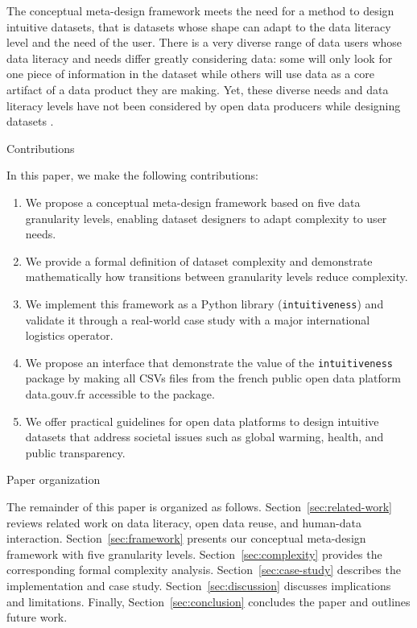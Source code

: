 \documentclass[]{hdsr}
\makeatletter
\def\subsection{\@startsection{subsection}{2}%
  \z@{.5\linespacing\@plus.7\linespacing}{.5\linespacing}%
  {\normalfont\bfseries}}
\theoremstyle{plain}      %
\theoremstyle{definition} %
\theoremstyle{remark}     %
\makeatother
\begin{document}
The conceptual meta-design framework meets the need for a method to design intuitive datasets, that is datasets whose shape can adapt to the data literacy level and the need of the user. There is a very diverse range of data users whose data literacy and needs differ greatly considering data: some will only look for one piece of information in the dataset while others will use data as a core artifact of a data product they are making. Yet, these diverse needs and data literacy levels have not been considered by open data producers while designing datasets \citep{dymytrova2018}.

\subsection{Contributions}

In this paper, we make the following contributions:
\begin{enumerate}
    \item We propose a conceptual meta-design framework based on five data granularity levels, enabling dataset designers to adapt complexity to user needs.
    \item We provide a formal definition of dataset complexity and demonstrate mathematically how transitions between granularity levels reduce complexity.
    \item We implement this framework as a Python library (\texttt{intuitiveness}) and validate it through a real-world case study with a major international logistics operator.
    \item We propose an interface that demonstrate the value of the \texttt{intuitiveness} package by making all CSVs files from the french public open data platform data.gouv.fr accessible to the package. 
    \item We offer practical guidelines for open data platforms to design intuitive datasets that address societal issues such as global warming, health, and public transparency.
\end{enumerate}

\subsection{Paper organization}

The remainder of this paper is organized as follows. Section~\ref{sec:related-work} reviews related work on data literacy, open data reuse, and human-data interaction. Section~\ref{sec:framework} presents our conceptual meta-design framework with five granularity levels. Section~\ref{sec:complexity} provides the corresponding formal complexity analysis. Section~\ref{sec:case-study} describes the implementation and case study. Section~\ref{sec:discussion} discusses implications and limitations. Finally, Section~\ref{sec:conclusion} concludes the paper and outlines future work.
\end{document}
